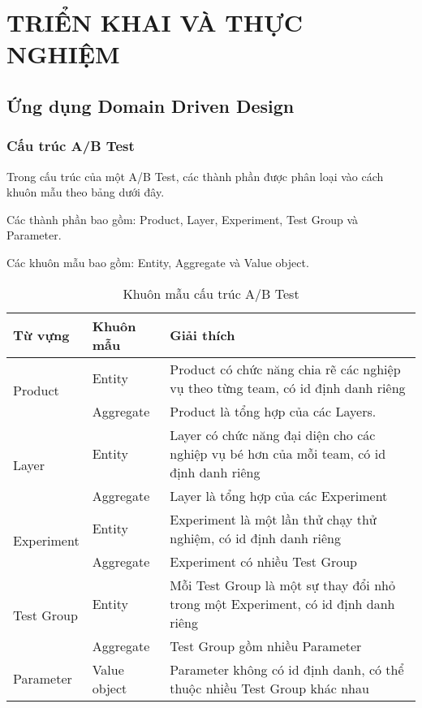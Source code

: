 \chapter{TRIỂN KHAI VÀ THỰC NGHIỆM}

\section{Ứng dụng Domain Driven Design}

\subsection{Cấu trúc A/B Test}

Trong cấu trúc của một A/B Test, các thành phần được phân loại vào cách khuôn mẫu theo bảng dưới đây.

Các thành phần bao gồm: Product, Layer, Experiment, Test Group và Parameter.

Các khuôn mẫu bao gồm: Entity, Aggregate và Value object.

\begin{table}[H]
	\centering
	\begin{tabular}{|l|l|p{11cm}|}
		\hline
		Từ vựng                     & Khuôn mẫu    & Giải thích                                                                               \\ \hline
		\multirow{2}{*}{Product}    & Entity       & Product có chức năng chia rẽ các nghiệp vụ theo từng team, có id định danh riêng         \\ \cline{2-3}
		                            & Aggregate    & Product là tổng hợp của các Layers.                                                      \\ \hline
		\multirow{2}{*}{Layer}      & Entity       & Layer có chức năng đại diện cho các nghiệp vụ bé hơn của mỗi team, có id định danh riêng \\ \cline{2-3}
		                            & Aggregate    & Layer là tổng hợp của các Experiment                                                     \\ \hline
		\multirow{2}{*}{Experiment} & Entity       & Experiment là một lần thử chạy thử nghiệm, có id định danh riêng                         \\ \cline{2-3}
		                            & Aggregate    & Experiment có nhiều Test Group                                                           \\ \hline
		\multirow{2}{*}{Test Group} & Entity       & Mỗi Test Group là một sự thay đổi nhỏ trong một Experiment, có id định danh riêng        \\ \cline{2-3}
		                            & Aggregate    & Test Group gồm nhiều Parameter                                                           \\ \hline
		Parameter                   & Value object & Parameter không có id định danh, có thể thuộc nhiều Test Group khác nhau                 \\ \hline
	\end{tabular}
	\caption{Khuôn mẫu cấu trúc A/B Test}
\end{table}

